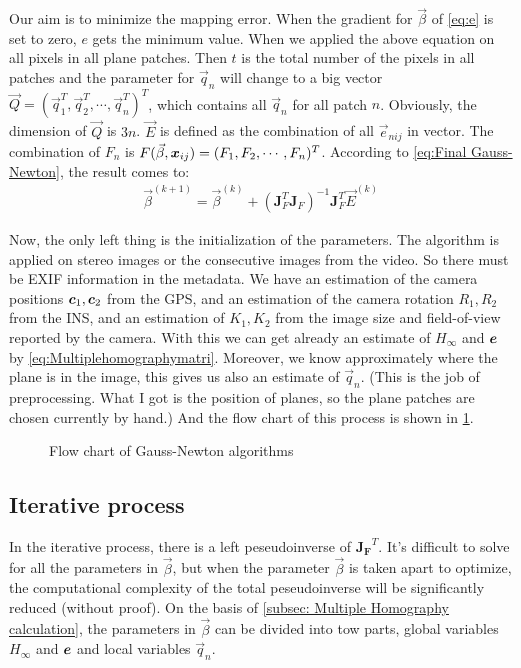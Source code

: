 Our aim is to minimize the mapping error. When the gradient for $\vec{\beta}$ of \cref{eq:e} is set to zero, $e$ gets the minimum value. When we applied the above equation on all pixels in all plane patches. Then $t$ is the total number of the pixels in all patches and the parameter for $\vec{q}_n$ will change to a big vector  $\vec{Q} = (\vec{q}_1^T, \vec{q}_2^T, \cdots, \vec{q}_n^T)^T$, which contains all $\vec{q}_n$ for all patch $n$. Obviously, the dimension of $\vec{Q}$ is $3n$.  $\vec{E}$ is defined as the combination of all $\vec{e}_{nij}$ in vector. The combination of $F_n$ is $F(\vec{\beta}, \boldsymbol{x}_{ij}) = (F_1, F_2, \cdots, F_n)^T$. 
According to \cref{eq:Final Gauss-Newton}, the result comes to:
\begin{align}
	\vec{\beta}^{(k+1)} = \vec{\beta}^{(k)} + \left(\mathbf{J}_{F}^{T} \mathbf{J}_{F} \right)^{-1} \mathbf{J}_{F}^{T} \vec{E}^{(k)}
\end{align}

Now, the only left thing is the initialization of the parameters. The algorithm is applied on stereo images or the consecutive images from the video. So there must be EXIF information in the metadata. We have an estimation of the camera positions $\boldsymbol{c}_1, \boldsymbol{c}_2$ from the GPS, and an estimation of the camera rotation $R_1, R_2$ from the INS, and an estimation of $K_1, K_2$ from the image size and field-of-view reported by the camera. With this we can get already an estimate of $H_\infty$ and $\boldsymbol{e}$ by \cref{eq:Multiplehomographymatri}. Moreover, we know approximately where the plane is in the image, this gives us also an estimate of $\vec{q}_n$. (This is the job of preprocessing. What I got is the position of planes, so the plane patches are chosen currently by hand.) And the flow chart of this process is shown in \cref{fig:work_flow_gauss_newton}. 
\begin{figure}[tbp]
	\centering
	
	\caption{Flow chart of Gauss-Newton algorithms}
	\label{fig:work_flow_gauss_newton}
\end{figure}



\subsection{Iterative process}
	
In the iterative process, there is a  left peseudoinverse of $\mathbf{J_{F}}^{T}$. It's difficult to solve for all the parameters in $\vec{\beta}$, but when  the parameter $\vec{\beta}$ is taken apart to optimize, the computational complexity of the total peseudoinverse will be significantly reduced (without proof). On the basis of \cref{subsec: Multiple Homography calculation}, the parameters in $\vec{\beta}$ can be divided into tow parts, global variables $H_\infty$ and $\boldsymbol{e}$ and local variables $\vec{q}_n$. 

